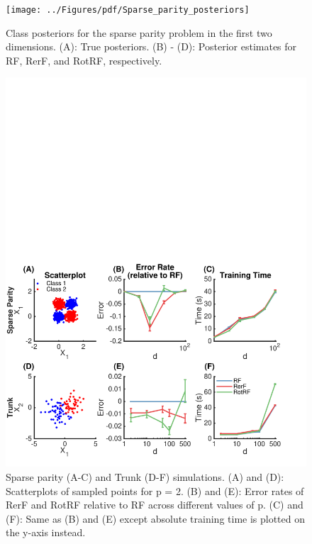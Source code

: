 \documentclass{article}
\begin{document}
\begin{figure}[ht]
\vskip 0.2in
\begin{center}
\centerline{\texttt{[image: ../Figures/pdf/Sparse\_parity\_posteriors]}}
\caption{Class posteriors for the sparse parity problem in the first two dimensions. (A): True posteriors. (B) - (D): Posterior estimates for RF, RerF, and RotRF, respectively.}
\label{posteriors}
\end{center}
\vskip -0.2in
\end{figure}

\begin{figure}[ht]
\vskip 0.2in
\begin{center}
\centerline{\includegraphics[width=\columnwidth]{../Figures/pdf/Fig2_simulations}}
\caption{Sparse parity (A-C) and Trunk (D-F) simulations. (A) and (D): Scatterplots of sampled points for p = 2. (B) and (E): Error rates of RerF and RotRF relative to RF across different values of p. (C) and (F): Same as (B) and (E) except absolute training time is plotted on the y-axis instead.}
\label{simulations}
\end{center}
\vskip -0.2in
\end{figure}
\end{document}
